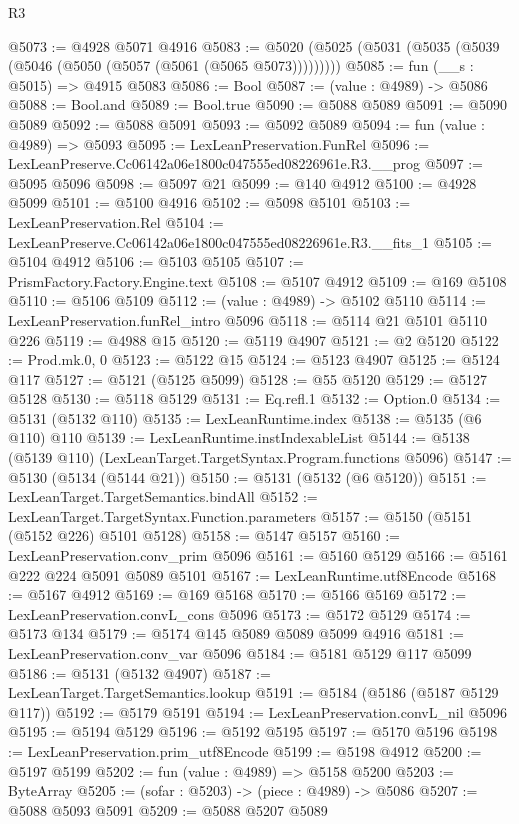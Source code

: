 \begin{lexlean}{R3}
\begin{coremodule}
@5073 := @4928 @5071 @4916
@5083 := @5020 (@5025 (@5031 (@5035 (@5039 (@5046 (@5050 (@5057 (@5061 (@5065 @5073)))))))))
@5085 := fun (__s : @5015) => @4915 @5083
@5086 := Bool
@5087 := (value : @4989) -> @5086
@5088 := Bool.and
@5089 := Bool.true
@5090 := @5088 @5089
@5091 := @5090 @5089
@5092 := @5088 @5091
@5093 := @5092 @5089
@5094 := fun (value : @4989) => @5093
@5095 := LexLeanPreservation.FunRel
@5096 := LexLeanPreserve.Cc06142a06e1800c047555ed08226961e.R3.__prog
@5097 := @5095 @5096
@5098 := @5097 @21
@5099 := @140 @4912
@5100 := @4928 @5099
@5101 := @5100 @4916
@5102 := @5098 @5101
@5103 := LexLeanPreservation.Rel
@5104 := LexLeanPreserve.Cc06142a06e1800c047555ed08226961e.R3.__fits_1
@5105 := @5104 @4912
@5106 := @5103 @5105
@5107 := PrismFactory.Factory.Engine.text
@5108 := @5107 @4912
@5109 := @169 @5108
@5110 := @5106 @5109
@5112 := (value : @4989) -> @5102 @5110
@5114 := LexLeanPreservation.funRel_intro @5096
@5118 := @5114 @21 @5101 @5110 @226
@5119 := @4988 @15
@5120 := @5119 @4907
@5121 := @2 @5120
@5122 := Prod.mk.{0, 0}
@5123 := @5122 @15
@5124 := @5123 @4907
@5125 := @5124 @117
@5127 := @5121 (@5125 @5099)
@5128 := @55 @5120
@5129 := @5127 @5128
@5130 := @5118 @5129
@5131 := Eq.refl.{1}
@5132 := Option.{0}
@5134 := @5131 (@5132 @110)
@5135 := LexLeanRuntime.index
@5138 := @5135 (@6 @110) @110
@5139 := LexLeanRuntime.instIndexableList
@5144 := @5138 (@5139 @110) (LexLeanTarget.TargetSyntax.Program.functions @5096)
@5147 := @5130 (@5134 (@5144 @21))
@5150 := @5131 (@5132 (@6 @5120))
@5151 := LexLeanTarget.TargetSemantics.bindAll
@5152 := LexLeanTarget.TargetSyntax.Function.parameters
@5157 := @5150 (@5151 (@5152 @226) @5101 @5128)
@5158 := @5147 @5157
@5160 := LexLeanPreservation.conv_prim @5096
@5161 := @5160 @5129
@5166 := @5161 @222 @224 @5091 @5089 @5101
@5167 := LexLeanRuntime.utf8Encode
@5168 := @5167 @4912
@5169 := @169 @5168
@5170 := @5166 @5169
@5172 := LexLeanPreservation.convL_cons @5096
@5173 := @5172 @5129
@5174 := @5173 @134
@5179 := @5174 @145 @5089 @5089 @5099 @4916
@5181 := LexLeanPreservation.conv_var @5096
@5184 := @5181 @5129 @117 @5099
@5186 := @5131 (@5132 @4907)
@5187 := LexLeanTarget.TargetSemantics.lookup
@5191 := @5184 (@5186 (@5187 @5129 @117))
@5192 := @5179 @5191
@5194 := LexLeanPreservation.convL_nil @5096
@5195 := @5194 @5129
@5196 := @5192 @5195
@5197 := @5170 @5196
@5198 := LexLeanPreservation.prim_utf8Encode
@5199 := @5198 @4912
@5200 := @5197 @5199
@5202 := fun (value : @4989) => @5158 @5200
@5203 := ByteArray
@5205 := (sofar : @5203) -> (piece : @4989) -> @5086
@5207 := @5088 @5093 @5091
@5209 := @5088 @5207 @5089

\end{coremodule}
\end{lexlean}
